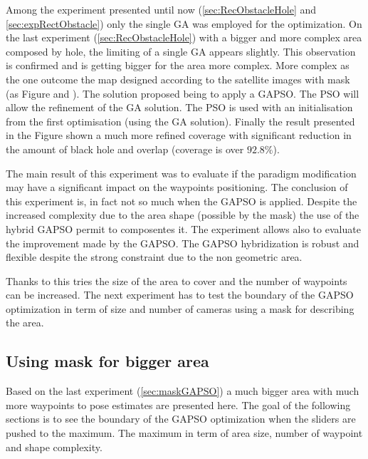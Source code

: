    Among the experiment presented until now (\ref{sec:RecObstacleHole} and \ref{sec:expRectObstacle}) only the single GA was employed for the optimization. On the last experiment (\ref{sec:RecObstacleHole}) with a bigger and more complex area composed by hole,  the limiting of a single GA appears slightly. This observation is confirmed and is getting bigger for the area more complex. More complex as the one outcome the map designed according to the satellite images with mask (as  Figure  and ).
The solution proposed being to apply a GAPSO. The PSO will allow the refinement of the GA solution.
The PSO is used with an initialisation from the first optimisation (using  the GA solution). 
Finally the result presented in the Figure  shown a much more refined  coverage with significant reduction in the amount of black hole and overlap (coverage is over $92.8\%$). 

The main result of this experiment was to evaluate if the paradigm modification may have a significant impact on the waypoints positioning.
 The conclusion of this experiment is, in fact not so much when the GAPSO is applied. Despite the increased complexity due to the area shape (possible by the mask) the use of the hybrid GAPSO permit to composentes it. The experiment allows also to evaluate the improvement made by the GAPSO. The GAPSO hybridization is robust and flexible despite the strong constraint due to the non geometric area.  

Thanks to this tries the size of the area to cover and the number of waypoints can be increased. The next experiment has to test the boundary of the GAPSO optimization in term of size and number of cameras using a mask for describing the area.


	\subsection{Using mask for bigger area}
	Based on the last experiment (\ref{sec:maskGAPSO}) a much bigger area with much more waypoints to pose estimates are presented here. The goal of the following sections is to see the boundary of the  GAPSO optimization when the sliders are pushed to the maximum. The maximum in term of area size, number of waypoint and shape complexity.
	

